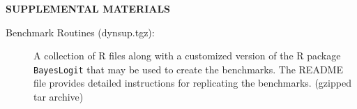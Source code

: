 \documentclass[12pt]{article}
\begin{document}
\newpage

\bigskip
\begin{center}
{\large\bf SUPPLEMENTAL MATERIALS}
\end{center}


\begin{description}

\item[Benchmark Routines (dynsup.tgz):] A collection of R files along with a customized
  version of the R package \texttt{BayesLogit} that may be used to create the
  benchmarks.  The README file provides detailed instructions for replicating
  the benchmarks.  (gzipped tar archive)

\end{description}


{}

\end{document}
